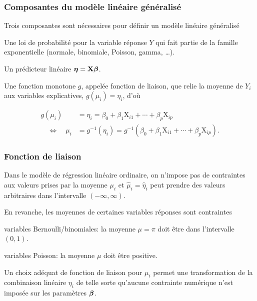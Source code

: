\documentclass{beamer}
\begin{document}
\begin{frame}
\frametitle{Composantes du modèle linéaire généralisé}
Trois composantes sont nécessaires pour définir un modèle linéaire
généralisé
\bi

\item Une loi de probabilité pour la variable réponse $Y$ qui fait partie de la famille exponentielle (normale, binomiale, Poisson, gamma, \ldots). 
\item Un prédicteur linéaire $\boldsymbol{\eta} = \mathbf{X}\boldsymbol{\beta}$.
\item Une fonction monotone $g$, appelée \alert{fonction de liaison}, que \alert{relie} la moyenne de $Y_i$ aux variables explicatives, $g(\mu_i)=\eta_i$, d'où
\begin{small}
\begin{align*}
g(\mu_i) & = \eta_i = \beta_0 + \beta_1 \mathrm{X}_{i1} + \cdots + \beta_p \mathrm{X}_{ip} \\
\quad \Leftrightarrow \quad \mu_i & = g^{-1}(\eta_i) = g^{-1}(\beta_0 + \beta_1 \mathrm{X}_{i1} + \cdots + \beta_p \mathrm{X}_{ip}).
\end{align*}
\end{small}
\ei
\end{frame}
\begin{frame}[fragile]
\frametitle{Fonction de liaison}
\bi
\item Dans le modèle de régression linéaire ordinaire, on n'impose pas de contraintes aux valeurs prises par la moyenne $\mu_i$ et $\hat{\mu}_i = \widehat{\eta}_i$ peut prendre des valeurs arbitraires dans l'intervalle $(-\infty, \infty)$. 
\item En revanche, les moyennes de certaines variables réponses sont contraintes
\bi
 
\item variables Bernoulli/binomiales: la moyenne $\mu=\pi$ doit être dans l'intervalle $(0, 1)$.
\item variables Poisson: la moyenne $\mu$ doit être positive.
\ei
\item Un choix adéquat de fonction de liaison pour $\mu_i$ permet une transformation de la combinaison linéaire $\eta_i$ de telle sorte qu'aucune contrainte numérique n'est imposée sur les paramètres $\boldsymbol {\beta}$.
\ei
\end{frame}
\end{document}
